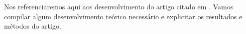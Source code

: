 Nos referenciaremos aqui aos desenvolvimento do artigo citado em \cite{Chafa__2018}. Vamos compilar algum desenvolvimento teórico necessário e explicitar os resultados e métodos do artigo.